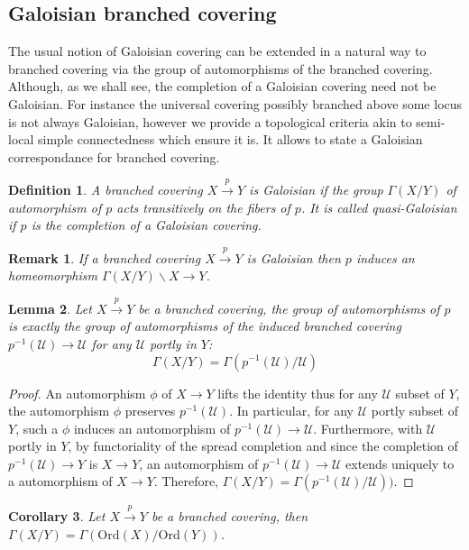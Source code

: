 \documentclass[a4paper,12pt]{article}
\newtheorem{lem}{Lemma}[section]          %
\newtheorem{cor}[lem]{Corollary}
\newtheorem{defi}[lem]{Definition}    %
\newtheorem{rem}{Remark}             %
\def\U{\mathcal U}
\def\U{\mathcal{U}}
\def\ord{\mathrm{Ord}}
\begin{document}
\subsection{Galoisian branched covering}

The usual notion of Galoisian covering can be extended in a natural way to branched covering via the group of automorphisms of the branched covering. Although, as we shall see, the completion of a Galoisian covering need not be Galoisian. For instance the universal  covering possibly branched above some locus is not always Galoisian, however we provide a topological criteria akin to semi-local simple connectedness which ensure it is. It allows to state a Galoisian correspondance for branched covering.

\begin{defi}\label{def:branched_covering_galoisian_group} A branched covering $X\xrightarrow{p} Y$ is Galoisian if the group $\Gamma(X/Y)$ of automorphism of $p$ acts transitively on the fibers of $p$. It is called quasi-Galoisian if $p$ is the completion of a Galoisian covering.  


\end{defi}

\begin{rem}\label{rem:branched_covering_galoisian_induces} If a branched covering $X\xrightarrow{p} Y$ is Galoisian then $p$ induces an homeomorphism $\Gamma(X/Y)\backslash X \rightarrow Y$. 
\end{rem}


\begin{lem}\label{lem:branched_covering_group_automorphisms} Let $X\xrightarrow{p} Y$ be a branched covering, the group of automorphisms of $p$ is exactly the group of automorphisms of the induced branched covering $p^{-1}(\U) \rightarrow \U$ for any $\U$ portly in $Y$:
$$\Gamma(X/Y) = \Gamma(p^{-1}(\U)/\U)$$
    
\end{lem}
\begin{proof}
 An automorphism $\phi$ of $X \rightarrow Y$ lifts the identity thus  for any $\U$ subset  of $Y$, the automorphism $\phi$ preserves $p^{-1}(\U)$. In particular, for any $\U$ portly subset of $Y$, such a $\phi$ induces an automorphism of $p^{-1}(\U) \xrightarrow{~~~} \U$. Furthermore, with $\U$ portly in $Y$, by functoriality of the spread completion and since the completion of $p^{-1}(\U)\rightarrow Y$ is $X\rightarrow Y$, an automorphism of $p^{-1}(\U) \xrightarrow{~~~} \U$ extends uniquely to a automorphism of $X \xrightarrow{~~~} Y$.   Therefore, $\Gamma(X/Y) = \Gamma(p^{-1}(\U)/\U))$.
\end{proof}
\begin{cor}\label{cor:branched_covering}Let $X\xrightarrow{p} Y$ be a branched covering, then
 $\Gamma(X/Y) =  \Gamma(\ord(X)/\ord(Y))$.
\end{cor}
\end{document}
